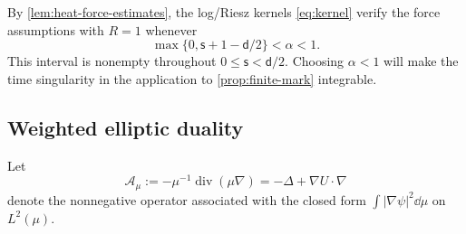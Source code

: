 \documentclass[11pt,reqno]{amsart}
\numberwithin{equation}{section}
\theoremstyle{plain}
\theoremstyle{remark}
\renewcommand{\d}{\mathsf{d}}\newcommand{\s}{\mathsf{s}}
\DeclareMathOperator{\diver}{div}
\newcommand{\Aop}{\mathcal A}
\begin{document}
By \cref{lem:heat-force-estimates}, the log/Riesz kernels \eqref{eq:kernel} verify the force assumptions with $R=1$ whenever
\begin{equation}\label{eq:alpha-choice}
 \max\{0,\s+1-\d/2\}<\alpha<1.
\end{equation}
This interval is nonempty throughout $0\le\s<\d/2$. Choosing $\alpha<1$ will make the time singularity in the application to \cref{prop:finite-mark} integrable.

\subsection{Weighted elliptic duality}
Let
\begin{equation}\label{eq:weighted-elliptic-operator}
 \Aop_\mu:=-\mu^{-1}\diver(\mu\nabla)
          =-\Delta+\nabla U\cdot\nabla
\end{equation}
denote the nonnegative operator associated with the closed form $\int|\nabla\psi|^2\dd\mu$ on $L^2(\mu)$.
\end{document}
